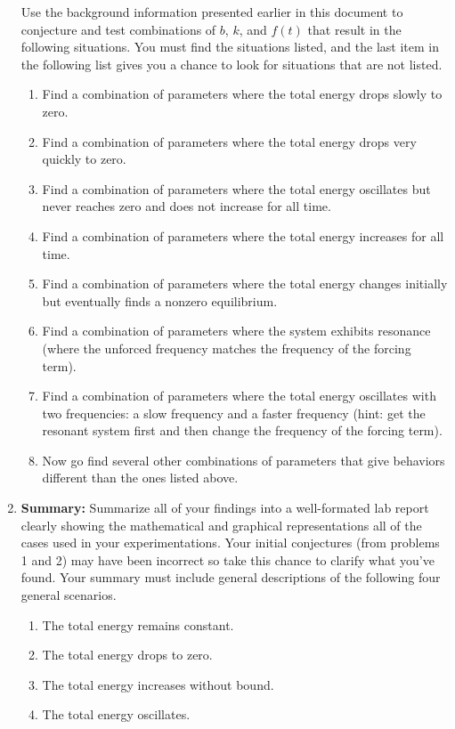 \begin{enumerate}
Use the background information presented earlier in this document to conjecture and test
combinations of $b$, $k$, and $f(t)$ that result in the following situations.  You must
find the situations listed, and the last item in the following list gives you a chance to
look for situations that are not listed.   
\begin{enumerate}
    \item Find a combination of parameters where the total energy drops slowly to zero.
    \item Find a combination of parameters where the total energy drops very quickly to
        zero.
    \item Find a combination of parameters where  the total energy oscillates but never
        reaches zero and does not increase for all time.
    \item Find a combination of parameters where the total energy increases for all time.
    \item Find a combination of parameters where the total energy changes initially but
        eventually finds a nonzero equilibrium.
    \item Find a combination of parameters where the system exhibits resonance (where the
        unforced frequency matches the frequency of the forcing term).
    \item Find a combination of parameters where the total energy oscillates with two
        frequencies: a slow frequency and a faster frequency (hint: get the resonant
        system first and then change the frequency of the forcing term).
    \item Now go find several other combinations of parameters that give behaviors
        different than the ones listed above.
\end{enumerate}

\item {\bf Summary:} Summarize all of your findings into a well-formated lab report clearly showing the
    mathematical and graphical representations all of the cases used in your
    experimentations.  Your initial conjectures (from problems 1 and 2) may have been
    incorrect so take this chance to clarify what you've found.  Your summary must include
    general descriptions of the following four general scenarios. 
    \begin{enumerate}
        \item The total energy remains constant.
        \item The total energy drops to zero.
        \item The total energy increases without bound.
        \item The total energy oscillates.
    \end{enumerate}

\end{enumerate}



